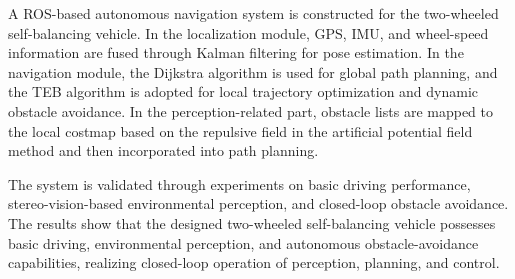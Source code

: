 \begin{eabstract}
A ROS-based autonomous navigation system is constructed for the two-wheeled self-balancing vehicle. In the localization module, GPS, IMU, and wheel-speed information are fused through Kalman filtering for pose estimation. In the navigation module, the Dijkstra algorithm is used for global path planning, and the TEB algorithm is adopted for local trajectory optimization and dynamic obstacle avoidance. In the perception-related part, obstacle lists are mapped to the local costmap based on the repulsive field in the artificial potential field method and then incorporated into path planning.

The system is validated through experiments on basic driving performance, stereo-vision-based environmental perception, and closed-loop obstacle avoidance. The results show that the designed two-wheeled self-balancing vehicle possesses basic driving, environmental perception, and autonomous obstacle-avoidance capabilities, realizing closed-loop operation of perception, planning, and control.
\end{eabstract}
